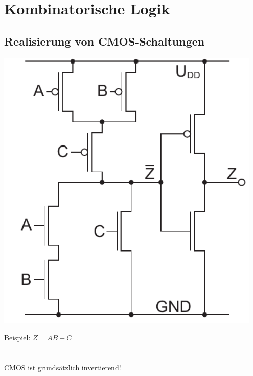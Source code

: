 \documentclass[a4paper,twocolumn,10pt]{article}
\begin{document}
\section*{Kombinatorische Logik}
\subsection*{Realisierung von CMOS-Schaltungen}
\begin{minipage}[b]{0.23\textwidth}
\includegraphics[width=0.95\textwidth]{Grafiken/CMOS-Schaltung}
\end{minipage}
\hfill
\begin{minipage}[b]{0.23\textwidth}
Beispiel: $Z=AB+C$\\\\\\
CMOS ist grundsätzlich invertierend!\\\\\\
\end{minipage}
\end{document}
